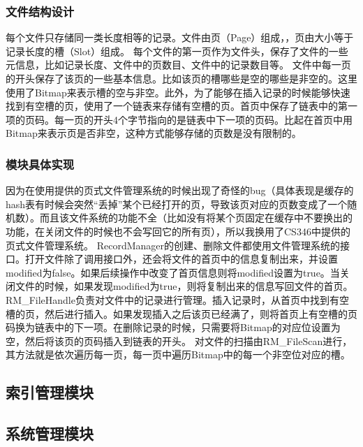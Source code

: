 \documentclass[11pt,UTF8]{report}
\begin{document}
\subsubsection{文件结构设计}
每个文件只存储同一类长度相等的记录。文件由页（Page）组成，，页由大小等于记录长度的槽（Slot）组成。
每个文件的第一页作为文件头，保存了文件的一些元信息，比如记录长度、文件中的页数目、文件中的记录数目等。
文件中每一页的开头保存了该页的一些基本信息。比如该页的槽哪些是空的哪些是非空的。这里使用了Bitmap来表示槽的空与非空。此外，为了能够在插入记录的时候能够快速找到有空槽的页，使用了一个链表来存储有空槽的页。首页中保存了链表中的第一项的页码。每一页的开头4个字节指向的是链表中下一项的页码。比起在首页中用Bitmap来表示页是否非空，这种方式能够存储的页数是没有限制的。

\subsubsection{模块具体实现}

因为在使用提供的页式文件管理系统的时候出现了奇怪的bug（具体表现是缓存的hash表有时候会突然“丢掉”某个已经打开的页，导致该页对应的页数变成了一个随机数）。而且该文件系统的功能不全（比如没有将某个页固定在缓存中不要换出的功能，在关闭文件的时候也不会写回它的所有页），所以我换用了CS346中提供的页式文件管理系统。
RecordManager的创建、删除文件都使用文件管理系统的接口。打开文件除了调用接口外，还会将文件的首页中的信息复制出来，并设置modified为false。如果后续操作中改变了首页信息则将modified设置为true。当关闭文件的时候，如果发现modified为true，则将复制出来的信息写回文件的首页。
RM\_FileHandle负责对文件中的记录进行管理。插入记录时，从首页中找到有空槽的页，然后进行插入。如果发现插入之后该页已经满了，则将首页上有空槽的页码换为链表中的下一项。在删除记录的时候，只需要将Bitmap的对应位设置为空，然后将该页的页码插入到链表的开头。
对文件的扫描由RM\_FileScan进行，其方法就是依次遍历每一页，每一页中遍历Bitmap中的每一个非空位对应的槽。

\subsection{索引管理模块}
\subsection{系统管理模块}
\end{document}
